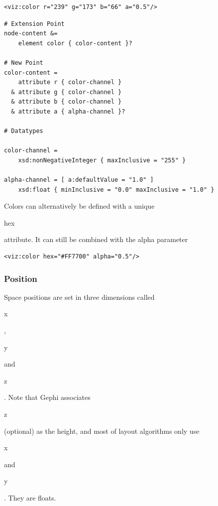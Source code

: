 \documentclass[a4paper,10pt]{article}
\begin{document}
\lstset{ style=gexf }
\begin{lstlisting}[caption={VIZ Color Declaration},label=vizcolor]
<viz:color r="239" g="173" b="66" a="0.5"/>
\end{lstlisting}

\lstset{ style=rnc }
\begin{lstlisting}[caption={Color Specification},label=colorRNC]
# Extension Point
node-content &=
    element color { color-content }?

# New Point
color-content =
    attribute r { color-channel }
  & attribute g { color-channel }
  & attribute b { color-channel }
  & attribute a { alpha-channel }?

# Datatypes

color-channel =
    xsd:nonNegativeInteger { maxInclusive = "255" }

alpha-channel = [ a:defaultValue = "1.0" ]
    xsd:float { minInclusive = "0.0" maxInclusive = "1.0" }
\end{lstlisting}

Colors can alternatively be defined with a unique \begin{footnotesize}hex\end{footnotesize} attribute. It can still be combined with the alpha parameter

\lstset{ style=gexf }
\begin{lstlisting}[caption={Color Hex Attribute},label=vizhex]
<viz:color hex="#FF7700" alpha="0.5"/>
\end{lstlisting}

\subsubsection{Position}

Space positions are set in three dimensions called \begin{footnotesize}x\end{footnotesize}, \begin{footnotesize}y\end{footnotesize} and \begin{footnotesize}z\end{footnotesize}. Note that Gephi associates \begin{footnotesize}z\end{footnotesize} (optional) as the height, and most of layout algorithms only use \begin{footnotesize}x\end{footnotesize} and \begin{footnotesize}y\end{footnotesize}. They are floats.
\end{document}
